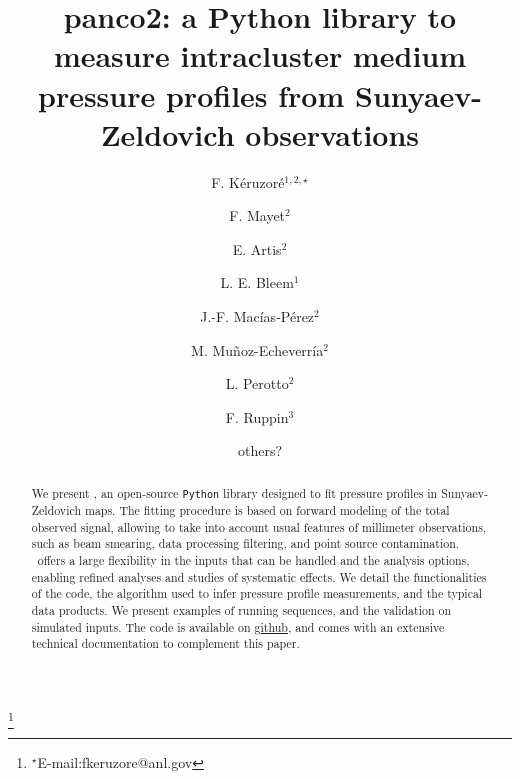 \documentclass[numberedappendix,twocolumn,twocolappendix]{openjournal}
\begin{document}
\title{panco2: a Python library to measure intracluster medium pressure profiles from Sunyaev-Zeldovich observations}

\author{F. K\'eruzor\'e$^{1,2,\star}$}
\author{F. Mayet$^{2}$}
\author{E. Artis$^{2}$}
\author{L. E. Bleem$^{1}$}
\author{J.-F. Mac\'ias-P\'erez$^{2}$}
\author{M. Mu\~noz-Echeverr\'ia$^{2}$}
\author{L. Perotto$^{2}$}
\author{F. Ruppin$^{3}$}
\author{others?}

\thanks{$^{\star}$E-mail:fkeruzore@anl.gov}



\begin{abstract}
    We present \panco, an open-source \texttt{Python} library designed to fit pressure profiles in Sunyaev-Zeldovich maps.
    The fitting procedure is based on forward modeling of the total observed signal, allowing to take into account usual features of millimeter observations, such as beam smearing, data processing filtering, and point source contamination.
    \panco\ offers a large flexibility in the inputs that can be handled and the analysis options, enabling refined analyses and studies of systematic effects.
    We detail the functionalities of the code, the algorithm used to infer pressure profile measurements, and the typical data products.
    We present examples of running sequences, and the validation on simulated inputs.
    The code is available on \href{https://github.com/fkeruzore/panco2}{github}, and comes with an extensive technical documentation to complement this paper.
\end{abstract}


\maketitle

\vspace{1cm}
\end{document}
